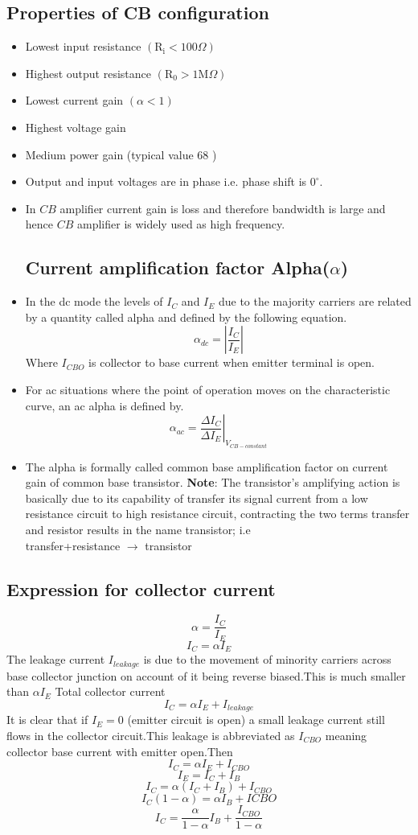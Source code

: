  \subsection{Properties of CB configuration}
 \begin{itemize}
 	\item Lowest input resistance $\left(\mathrm{R}_{\mathrm{i}}<100 \Omega\right)$
 \item	Highest output resistance $\left(\mathrm{R}_{0}>1 \mathrm{M} \Omega\right)$
 \item	Lowest current gain $(\alpha<1)$
 \item	Highest voltage gain
 \item	Medium power gain (typical value 68 )
 \item	Output and input voltages are in phase i.e. phase shift is $0^{\circ}$.
 \item	In $C B$ amplifier current gain is loss and therefore bandwidth is large and hence $C B$ amplifier is widely used as high frequency.\\
 \subsection{Current amplification factor Alpha($\alpha$)}
 \item In the dc mode the levels of $I_{C}$ and $I_{E}$ due to the majority carriers are related by a quantity called alpha and defined by the following equation.
 $$
 \alpha_{d c}=\left|\frac{I_{C}}{I_{E}}\right|
 $$
 Where $I_{C B O}$ is collector to base current when emitter terminal is open.
 \item For ac situations where the point of operation moves on the characteristic curve, an ac alpha is defined by.
 $$\alpha_{ac}=\left.\frac{\Delta I_{C}}{\Delta I_{E}}\right|_{V_{CB-constant}}$$
 \item The alpha is formally called common base amplification factor on current gain of common base transistor.
 \textbf{Note}: The transistor's amplifying action is basically due to its capability of transfer its signal current from a low resistance circuit to high resistance circuit, contracting the two terms transfer and resistor results in the name transistor; i.e\\
  transfer+resistance  $\rightarrow $ transistor 
 \end{itemize}
\subsection{Expression for collector current}
$$\alpha=\frac{I_C}{I_E}$$
$$I_C=\alpha I_E$$ 
The leakage current $I_{leakage}$ is due to the movement of minority carriers across base collector junction on account of it being reverse biased.This is much smaller than $\alpha I_E$
Total collector current\\
$$I_C=\alpha I_E+I_{leakage}$$
It is clear that if $I_E=0$ (emitter circuit is open) a small leakage current still flows in the collector circuit.This leakage is abbreviated as $I_{CBO}$ meaning collector base current with emitter open.Then 
$$I_C=\alpha I_E+I_{CBO}$$
$$I_E=I_C+I_B$$
$$I_C=\alpha(I_C+I_B)+I_{CBO}$$
$$I_C(1-\alpha)=\alpha I_B+I{CBO}$$
$$I_C=\frac{\alpha}{1-\alpha}I_B+\frac{I_{CBO}}{1-\alpha}$$
